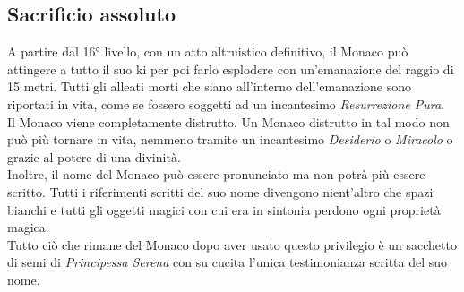 \subsection{Sacrificio assoluto}

A partire dal 16° livello, con un atto altruistico definitivo, il Monaco può attingere a tutto il suo ki per poi farlo esplodere con un'emanazione del raggio di 15 metri. Tutti gli alleati morti che siano all'interno dell'emanazione sono riportati in vita, come se fossero soggetti ad un incantesimo \textit{Resurrezione Pura}. \\ Il Monaco viene completamente distrutto. Un Monaco distrutto in tal modo non può più tornare in vita, nemmeno tramite un incantesimo \textit{Desiderio} o \textit{Miracolo} o grazie al potere di una divinità. \\ Inoltre, il nome del Monaco può essere pronunciato ma non potrà più essere scritto. Tutti i riferimenti scritti del suo nome divengono nient'altro che spazi bianchi e tutti gli oggetti magici con cui era in sintonia perdono ogni proprietà magica. \\ Tutto ciò che rimane del Monaco dopo aver usato questo privilegio è un sacchetto di semi di \textit{Principessa Serena} con su cucita l'unica testimonianza scritta del suo nome.

